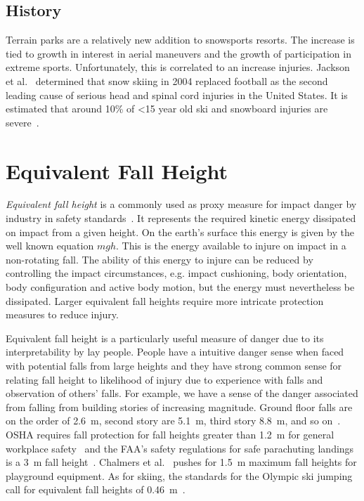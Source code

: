 \documentclass{article}
\begin{document}
\subsection{History}
%
Terrain parks are a relatively new addition to snowsports resorts. The increase
is tied to growth in interest in aerial maneuvers and the growth of
participation in extreme sports. Unfortunately, this is correlated to an
increase injuries.  Jackson et al.~\cite{Jackson2004} determined that snow
skiing in 2004 replaced football as the second leading cause of serious head
and spinal cord injuries in the United States. It is estimated that around 10\%
of <15 year old ski and snowboard injuries are severe~\cite{Polites2018}.

\section{Equivalent Fall Height}
%
\emph{Equivalent fall height} is a commonly used as proxy measure for impact
danger by industry in safety standards~\cite{Hubbard2012}. It represents the
required kinetic energy dissipated on impact from a given height. On the
earth's surface this energy is given by the well known equation $mgh$. This is
the energy available to injure on impact in a non-rotating fall. The ability of
this energy to injure can be reduced by controlling the impact circumstances,
e.g. impact cushioning, body orientation, body configuration and active body
motion, but the energy must nevertheless be dissipated. Larger equivalent fall
heights require more intricate protection measures to reduce injury.

Equivalent fall height is a particularly useful measure of danger due to its
interpretability by lay people. People have a intuitive danger sense when faced
with potential falls from large heights and they have strong common sense for
relating fall height to likelihood of injury due to experience with falls and
observation of others' falls. For example, we have a sense of the danger
associated from falling from building stories of increasing magnitude. Ground
floor falls are on the order of 2.6~\si{\meter}, second story are
5.1~\si{\meter}, third story 8.8~\si{\meter}, and so on~\cite{Vish2005}. OSHA
requires fall protection for fall heights greater than 1.2~\si{\meter} for
general workplace safety~ and the FAA's safety regulations
for safe parachuting landings is a 3~\si{\meter} fall height~.  Chalmers et al.~\cite{Chalmers1996} pushes for 1.5~\si{\meter}
maximum fall heights for playground equipment. As for skiing, the standards for
the Olympic ski jumping call for equivalent fall heights of
0.46~\si{\meter}~.
\end{document}
